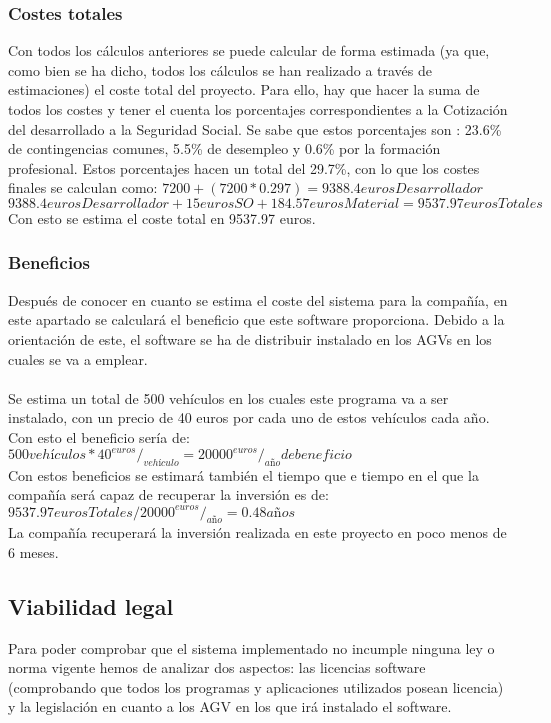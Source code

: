 \subsubsection{Costes totales}
Con todos los cálculos anteriores se puede calcular de forma estimada (ya que, como bien se ha dicho, todos los cálculos se han realizado a través de estimaciones) el coste total del proyecto. Para ello, hay que hacer la suma de todos los costes y tener el cuenta los porcentajes correspondientes a la Cotización del desarrollado a la Seguridad Social. Se sabe que estos porcentajes son : 23.6\% de contingencias comunes, 5.5\% de desempleo y 0.6\% por la formación profesional. Estos porcentajes hacen un total del 29.7\%, con lo que los costes finales se calculan como:
$7200 + (7200 * 0.297) = 9388.4 eurosDesarrollador$\\
$9388.4 eurosDesarrollador + 15 eurosSO + 184.57  eurosMaterial = 9537.97 eurosTotales$ \\
Con esto se estima el coste total en 9537.97 euros.\\

\subsubsection{Beneficios}
Después de conocer en cuanto se estima el coste del sistema para la compañía, en este apartado se calculará el beneficio que este software proporciona. Debido a la orientación de este, el software se ha de distribuir instalado en los AGVs en los cuales se va a emplear.\\
\\
Se estima un total de 500 vehículos en los cuales este programa va a ser instalado, con un precio de 40 euros por cada uno de estos vehículos cada año. Con esto el beneficio sería de:\\
$500 vehículos * 40 ^{euros}/_{vehículo} = 20000 ^{euros}/_{año} de beneficio $\\
Con estos beneficios se estimará también el tiempo que e tiempo en el que la compañía será capaz de recuperar la inversión es de:\\
$9537.97 eurosTotales /  20000 ^{euros}/_{año}= 0.48 años$\\
La compañía recuperará la inversión realizada en este proyecto en poco menos de 6 meses.\\

\subsection{Viabilidad legal}
Para poder comprobar que el sistema implementado no incumple ninguna ley o norma vigente hemos de analizar dos aspectos: las licencias software (comprobando que todos los programas y aplicaciones utilizados posean licencia) y la legislación en cuanto a los AGV en los que irá instalado el software.\\

